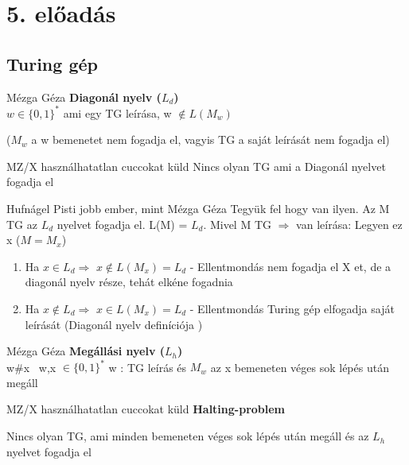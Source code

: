 \section{5. előadás}
\subsection{Turing gép}

\begin{definicio}{Mézga Géza}
  	\textbf{Diagonál nyelv ($L_d$)} \\[3pt]
	 $w \in \lbrace 0,1 \rbrace^*$ ami egy TG leírása, w $\not\in L(M_w)$

	 ($M_w$ a w bemenetet nem fogadja el, vagyis TG a saját leírását nem fogadja el)\\[0pt]
\end{definicio}

	 \begin{tetel}{MZ/X használhatatlan cuccokat küld}
   Nincs olyan TG ami a Diagonál nyelvet fogadja el \\[3pt]
   \end{tetel}

\begin{bizonyitas}{Hufnágel Pisti jobb ember, mint Mézga Géza}
 Tegyük fel hogy van ilyen. Az M TG az $L_d$ nyelvet fogadja el. L(M) = $L_d$. Mivel M TG $\Rightarrow$ van leírása: Legyen ez x ($M = M_x$)

	\begin{enumerate}[itemsep=0 mm]
		\item Ha $x \in L_d \Rightarrow$ $x \not\in L(M_x) = L_d$ - Ellentmondás nem fogadja el X et, de a diagonál nyelv része, tehát elkéne fogadnia
		\item Ha $x \not\in L_d \Rightarrow$ $x \in L(M_x) = L_d$ - Ellentmondás Turing gép elfogadja saját leírását (Diagonál nyelv definíciója )
	\end{enumerate}
\end{bizonyitas}

\begin{definicio}{Mézga Géza}
	\textbf{Megállási nyelv ($L_h$)} \\[3pt]
	 w\#x \ w,x $\in \lbrace 0,1 \rbrace^*$ w : TG leírás és $M_w$ az x bemeneten véges sok lépés után megáll\\[0pt]
\end{definicio}

	 \begin{tetel}{MZ/X használhatatlan cuccokat küld}
   \textbf{Halting-problem}

	  Nincs olyan TG, ami minden bemeneten véges sok lépés után megáll és az $L_h$ nyelvet fogadja el
\end{tetel}

